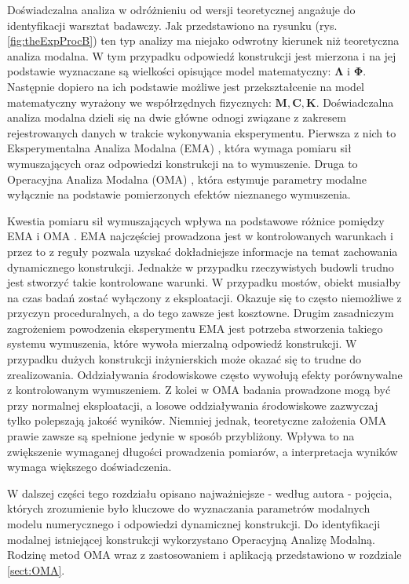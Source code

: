 Doświadczalna analiza w odróżnieniu od wersji teoretycznej angażuje do identyfikacji warsztat badawczy. Jak przedstawiono na rysunku (rys. \ref{fig:theExpProcB}) ten typ analizy ma niejako odwrotny kierunek niż teoretyczna analiza modalna. W tym przypadku odpowiedź konstrukcji jest mierzona i na jej podstawie wyznaczane są wielkości opisujące model matematyczny: $\mathbf{\Lambda}$ i $\mathbf{\Phi}$. Następnie dopiero na ich podstawie możliwe jest przekształcenie na model matematyczny wyrażony we współrzędnych fizycznych: $\mathbf{M}, \mathbf{C}, \mathbf{K}$. Doświadczalna analiza modalna dzieli się na dwie główne odnogi związane z zakresem rejestrowanych danych w trakcie wykonywania eksperymentu. Pierwsza z nich to Eksperymentalna Analiza Modalna (EMA) , która wymaga pomiaru sił wymuszających oraz odpowiedzi konstrukcji na to wymuszenie. Druga to Operacyjna Analiza Modalna (OMA) , która estymuje parametry modalne wyłącznie na podstawie pomierzonych efektów nieznanego wymuszenia. 

Kwestia pomiaru sił wymuszających wpływa na podstawowe różnice pomiędzy EMA i OMA \cite{Bien2007}. EMA najczęściej prowadzona jest w kontrolowanych warunkach i przez to z reguły pozwala uzyskać dokładniejsze informacje na temat zachowania dynamicznego konstrukcji. Jednakże w przypadku rzeczywistych budowli trudno jest stworzyć takie kontrolowane warunki. W przypadku mostów, obiekt musiałby na czas badań zostać wyłączony z eksploatacji. Okazuje się to często niemożliwe z przyczyn proceduralnych, a do tego zawsze jest kosztowne. Drugim zasadniczym zagrożeniem powodzenia eksperymentu EMA jest potrzeba stworzenia takiego systemu wymuszenia, które wywoła mierzalną odpowiedź konstrukcji. W przypadku dużych konstrukcji inżynierskich może okazać się to trudne do zrealizowania. Oddziaływania środowiskowe często wywołują efekty porównywalne z kontrolowanym wymuszeniem. Z kolei w OMA badania prowadzone mogą być przy normalnej eksploatacji, a losowe oddziaływania środowiskowe zazwyczaj tylko polepszają jakość wyników. Niemniej jednak, teoretyczne założenia OMA prawie zawsze są spełnione jedynie w sposób przybliżony. Wpływa to na zwiększenie wymaganej długości prowadzenia pomiarów, a interpretacja wyników wymaga większego doświadczenia. 

W dalszej części tego rozdziału opisano najważniejsze - według autora - pojęcia, których zrozumienie było kluczowe do wyznaczania parametrów modalnych modelu numerycznego i odpowiedzi dynamicznej konstrukcji. Do identyfikacji modalnej istniejącej konstrukcji wykorzystano Operacyjną Analizę Modalną. Rodzinę metod OMA wraz z zastosowaniem i aplikacją przedstawiono w rozdziale \ref{sect:OMA}.

